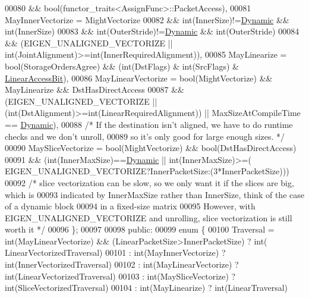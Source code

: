\begin{DoxyCode}
00080                   && \textcolor{keywordtype}{bool}(functor\_traits<AssignFunc>::PacketAccess),
00081     MayInnerVectorize  = MightVectorize
00082                        && int(InnerSize)!=\hyperlink{namespace_eigen_ad81fa7195215a0ce30017dfac309f0b2}{Dynamic} && int(InnerSize)%
00083                        && int(OuterStride)!=\hyperlink{namespace_eigen_ad81fa7195215a0ce30017dfac309f0b2}{Dynamic} && int(OuterStride)%
00084                        && (EIGEN\_UNALIGNED\_VECTORIZE  || int(JointAlignment)>=int(InnerRequiredAlignment)),
00085     MayLinearize = \textcolor{keywordtype}{bool}(StorageOrdersAgree) && (int(DstFlags) & int(SrcFlags) & 
      \hyperlink{group__flags_ga4b983a15d57cd55806df618ac544d09e}{LinearAccessBit}),
00086     MayLinearVectorize = \textcolor{keywordtype}{bool}(MightVectorize) && MayLinearize && DstHasDirectAccess
00087                        && (EIGEN\_UNALIGNED\_VECTORIZE || (int(DstAlignment)>=int(LinearRequiredAlignment)) 
      || MaxSizeAtCompileTime == \hyperlink{namespace_eigen_ad81fa7195215a0ce30017dfac309f0b2}{Dynamic}),
00088       \textcolor{comment}{/* If the destination isn't aligned, we have to do runtime checks and we don't unroll,}
00089 \textcolor{comment}{         so it's only good for large enough sizes. */}
00090     MaySliceVectorize  = bool(MightVectorize) && bool(DstHasDirectAccess)
00091                        && (int(InnerMaxSize)==\hyperlink{namespace_eigen_ad81fa7195215a0ce30017dfac309f0b2}{Dynamic} || int(InnerMaxSize)>=(
      EIGEN\_UNALIGNED\_VECTORIZE?InnerPacketSize:(3*InnerPacketSize)))
00092       \textcolor{comment}{/* slice vectorization can be slow, so we only want it if the slices are big, which is}
00093 \textcolor{comment}{         indicated by InnerMaxSize rather than InnerSize, think of the case of a dynamic block}
00094 \textcolor{comment}{         in a fixed-size matrix}
00095 \textcolor{comment}{         However, with EIGEN\_UNALIGNED\_VECTORIZE and unrolling, slice vectorization is still worth it */}
00096   \};
00097 
00098 \textcolor{keyword}{public}:
00099   \textcolor{keyword}{enum} \{
00100     Traversal = int(MayLinearVectorize) && (LinearPacketSize>InnerPacketSize) ? \textcolor{keywordtype}{int}(
      LinearVectorizedTraversal)
00101               : int(MayInnerVectorize)   ? int(InnerVectorizedTraversal)
00102               : int(MayLinearVectorize)  ? int(LinearVectorizedTraversal)
00103               : int(MaySliceVectorize)   ? int(SliceVectorizedTraversal)
00104               : int(MayLinearize)        ? int(LinearTraversal)

\end{DoxyCode}
